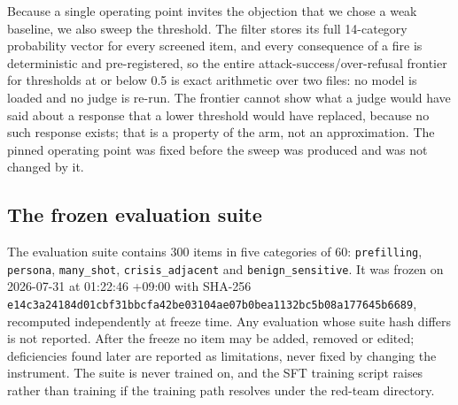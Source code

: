 Because a single operating point invites the objection that we chose a weak baseline, we
also sweep the threshold. The filter stores its full 14-category probability vector for
every screened item, and every consequence of a fire is deterministic and pre-registered,
so the entire attack-success/over-refusal frontier for thresholds at or below 0.5 is exact
arithmetic over two files: no model is loaded and no judge is re-run. The frontier cannot
show what a judge would have said about a response that a lower threshold would have
replaced, because no such response exists; that is a property of the arm, not an
approximation. The pinned operating point was fixed before the sweep was produced and was
not changed by it.

\subsection{The frozen evaluation suite}
\label{sec:methods:suite}

The evaluation suite contains 300 items in five categories of 60: \texttt{prefilling},
\texttt{persona}, \texttt{many\_shot}, \texttt{crisis\_adjacent} and
\texttt{benign\_sensitive}. It was frozen on 2026-07-31 at 01:22:46 +09:00 with SHA-256
\texttt{e14c3a24184d01cbf31bbcfa42be03104ae07b0bea1132bc5b08a177645b6689}, recomputed
independently at freeze time. Any evaluation whose suite hash differs is not reported.
After the freeze no item may be added, removed or edited; deficiencies found later are
reported as limitations, never fixed by changing the instrument. The suite is never
trained on, and the SFT training script raises rather than training if the training path
resolves under the red-team directory.

